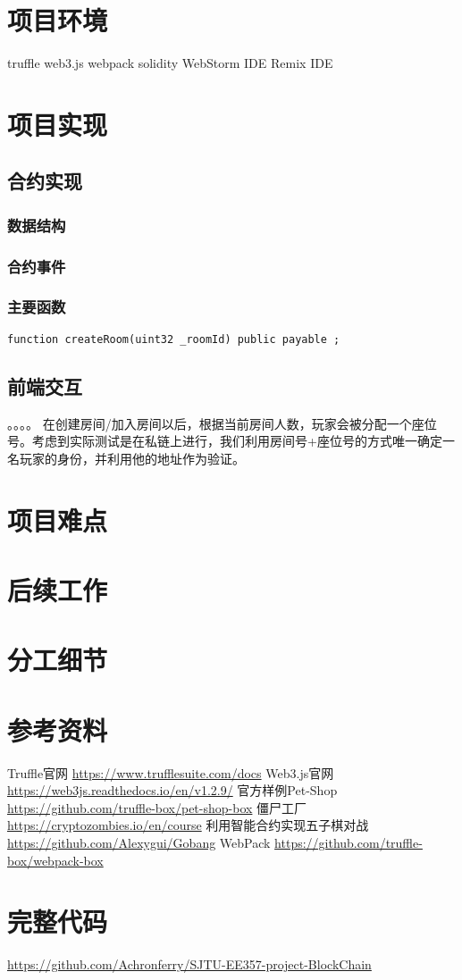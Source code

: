 \documentclass[12pt]{report}
\begin{document}
\section{项目环境}
truffle web3.js webpack solidity WebStorm IDE Remix IDE
\section{项目实现}
\subsection{合约实现}
\subsubsection{数据结构}
\subsubsection{合约事件}
\subsubsection{主要函数}
\begin{lstlisting}
function createRoom(uint32 _roomId) public payable ;
\end{lstlisting}
\subsection{前端交互}
。。。。
在创建房间/加入房间以后，根据当前房间人数，玩家会被分配一个座位号。考虑到实际测试是在私链上进行，我们利用房间号+座位号的方式唯一确定一名玩家的身份，并利用他的地址作为验证。
\section{项目难点}

\section{后续工作}
\section{分工细节}
\section{参考资料}
\begin{enumerate}
	 Truffle官网 \url{https://www.trufflesuite.com/docs}
		Web3.js官网 \url{https://web3js.readthedocs.io/en/v1.2.9/}
	 官方样例Pet-Shop \url{https://github.com/truffle-box/pet-shop-box}
	 僵尸工厂 \url{https://cryptozombies.io/en/course}
	 利用智能合约实现五子棋对战 \url{https://github.com/Alexygui/Gobang}
	 WebPack \url{https://github.com/truffle-box/webpack-box}
\end{enumerate}




\section{完整代码}
\noindent\url{https://github.com/Achronferry/SJTU-EE357-project-BlockChain}
\end{document}
